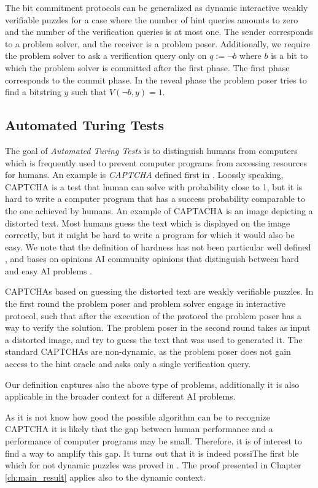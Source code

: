 \documentclass[11pt,a4paper,titlepage]{memoir}
\begin{document}
The bit commitment protocols can be generalized as dynamic interactive weakly verifiable puzzles for a
case where the number of hint queries amounts to zero and the number of the verification queries is at most one.
The sender corresponds to a problem solver, and the receiver is a problem poser.
Additionally, we require the problem solver to ask a verification query only on $q := \lnot b$ where $b$
is a bit to which the problem solver is committed after the first phase.
The first phase corresponds to the commit phase.
In the reveal phase the problem poser tries to find a bitstring $y$ such that $V(\lnot b, y) = 1$.

\subsection{Automated Turing Tests}
The goal of \textit{Automated Turing Tests} is to distinguish humans from computers which
is frequently used to prevent computer programs from accessing resources for humans.
An example is \textit{CAPTCHA} defined first in \cite{von2003captcha}.
Loossly speaking, CAPTCHA is a test that human can solve with probability close to 1, but it is hard to write a computer program
that has a success probability comparable to the one achieved by humans.
An example of CAPTACHA is an image depicting a distorted text. Most humans guess the text which is displayed on the image correctly, but it might be hard to write
a program for which it would also be easy. We note that the definition of hardness has not been particular well defined ,
and bases on opinions AI community opinions that distinguish between hard and easy AI problems \cite{von2003captcha}.

CAPTCHAs based on guessing the distorted text are weakly verifiable puzzles.
In the first round the problem poser and problem solver engage in interactive protocol, such that
after the execution of the protocol the problem poser has a way to verify the solution.
The problem poser in the second round takes as input a distorted image, and try to guess the text that was used to generated it.
The standard CAPTCHAs are non-dynamic, as the problem poser does not gain access to the hint oracle and
asks only a single verification query.

Our definition captures also the above type of problems, additionally it is also applicable in the broader context for a different
AI problems.

As it is not know how good the possible algorithm can be to recognize CAPTCHA it is likely that the gap between human
performance and a performance of computer programs may be small. Therefore, it is of interest to find a way to amplify this gap.
It turns out that it is indeed possiThe first ble which for not dynamic puzzles was proved in \cite{DBLP:journals/corr/abs-1002-3534}.
The proof presented in Chapter \ref{ch:main_result} applies also to the dynamic context.
\end{document}
